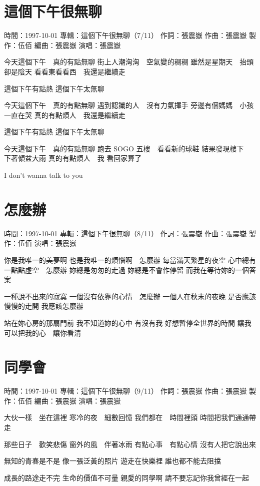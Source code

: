 \documentclass[UTF8,a4paper,oneside,twocolumn,12pt]{ctexbook}
\newcommand{\infopair}[2]{\textbullet #1：#2}
\newcommand{\zc}[1][伍佰]{\infopair{作詞}{#1}}
\newcommand{\zq}[1][伍佰]{\infopair{作曲}{#1}}
\newcommand{\bq}[1][伍佰]{\infopair{編曲}{#1}}
\newcommand{\zj}[1]{\infopair{專輯}{#1}}
\newcommand{\zz}[1]{\infopair{製作}{#1}}
\newcommand{\sj}[1]{\infopair{時間}{#1}}
\newenvironment{info}{\begin{flushleft}\kaishu
	}
	{\end{flushleft}\normalsize\yahei\par}
\newenvironment{lyric}{
	}
{}
\begin{document}
\section{這個下午很無聊}
\begin{info}
	\sj{1997-10-01}
	\zj{這個下午很無聊（7/11）}
	\zc[張震嶽]
	\zq[張震嶽]
	\zz{伍佰}
	\bq[張震嶽]
	\infopair{演唱}{張震嶽}
\end{info}
\begin{lyric}
	今天這個下午　真的有點無聊
	街上人潮洶洶　空氣變的稠稠
	雖然是星期天　抬頭卻是陰天
	看看東看看西　我還是繼續走

	這個下午有點熱 這個下午太無聊

	今天這個下午　真的有點無聊
	遇到認識的人　沒有力氣揮手
	旁邊有個媽媽　小孩一直在哭
	真的有點煩人　我還是繼續走

	這個下午有點熱 這個下午太無聊

	今天這個下午　真的有點無聊
	跑去 SOGO 五樓　看看新的球鞋
	結果發現樓下　下著傾盆大雨
	真的有點煩人　我 看回家算了

	I don't wanna talk to you
\end{lyric}

\section{怎麼辦}
\begin{info}
	\sj{1997-10-01}
	\zj{這個下午很無聊（8/11）}
	\zc[張震嶽]
	\zq[張震嶽]
	\zz{伍佰}
	\infopair{演唱}{張震嶽}
\end{info}
\begin{lyric}
	你是我唯一的美夢啊
	也是我唯一的煩惱啊　怎麼辦
	每當滿天繁星的夜空
	心中總有一點點虛空　怎麼辦
	妳總是匆匆的走過
	妳總是不會作停留
	而我在等待妳的一個答案

	一種說不出來的寂寞
	一個沒有依靠的心情　怎麼辦
	一個人在秋末的夜晚
	是否應該慢慢的走開
	我應該怎麼辦

	站在妳心房的那扇門前
	我不知道妳的心中 有沒有我
	好想暫停全世界的時間
	讓我可以把我的心　讓你看清
\end{lyric}

\section{同學會}
\begin{info}
	\sj{1997-10-01}
	\zj{這個下午很無聊（9/11）}
	\zc[張震嶽]
	\zq[張震嶽]
	\zz{伍佰}
	\bq[張震嶽]
	\infopair{演唱}{張震嶽}
\end{info}
\begin{lyric}
	大伙一樣　坐在這裡
	寒冷的夜　細數回憶
	我們都在　時間裡頭
	時間把我們通通帶走

	那些日子　歡笑悲傷
	窗外的風　伴著冰雨
	有點心事　有點心情
	沒有人把它說出來

	無知的青春是不是
	像一張泛黃的照片
	遊走在快樂裡
	誰也都不能去阻擋

	成長的路途走不完
	生命的價值不可量
	親愛的同學啊
	請不要忘記你我曾經在一起
\end{lyric}
\end{document}
